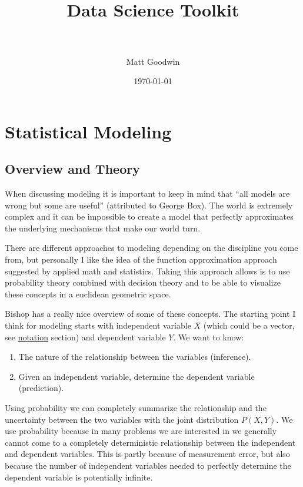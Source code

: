 \documentclass[paper=a4, fontsize=11pt]{scrartcl} %
\title{	
\normalfont \normalsize 
\horrule{0.5pt} \\[0.4cm] %
\huge Data Science Toolkit \\ %
\horrule{2pt} \\[0.5cm] %
}
\author{Matt Goodwin} %
\date{\normalsize\today} %
\numberwithin{equation}{section} %
\numberwithin{figure}{section} %
\numberwithin{table}{section} %
\begin{document}
\maketitle 

\tableofcontents
\newpage


\section{Statistical Modeling}
\subsection{Overview and Theory}

When discussing modeling it is important to keep in mind that ``all models are wrong but some are useful'' (attributed to George Box). The world is extremely complex and it can be impossible to create a model that perfectly approximates the underlying mechanisms that make our world turn.

There are different approaches to modeling depending on the discipline you come from, but personally I like the idea of the function approximation approach suggested by applied math and statistics. Taking this approach allows is to use probability theory combined with decision theory and to be able to visualize these concepts in a euclidean geometric space.

Bishop has a really nice overview of some of these concepts. The starting point I think for modeling starts with independent variable $X$ (which could be a vector, see \hyperref[sec:notation]{notation} section) and dependent variable $Y$. We want to know:

\begin{enumerate}
\item The nature of the relationship between the variables (inference). 
\item Given an independent variable, determine the dependent variable (prediction).
\end{enumerate}

Using probability we can completely summarize the relationship and the uncertainty between the two variables with the joint distribution $P(X,Y)$. We use probability because in many problems we are interested in we generally cannot come to a completely deterministic relationship between the independent and dependent variables. This is partly because of measurement error, but also because the number of independent variables needed to perfectly determine the dependent variable is potentially infinite. 
\end{document}
